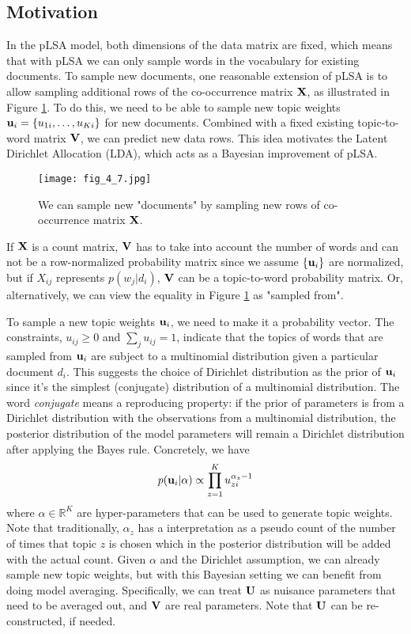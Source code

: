 \documentclass[../book-template.tex]{subfiles}
\begin{document}
\subsection{Motivation}
In the pLSA model, both dimensions of the data matrix are fixed, which means that with pLSA we can only sample words in the vocabulary for existing documents. To sample new documents, one reasonable extension of pLSA is to allow sampling additional rows of the co-occurrence matrix ${\bf X}$, as illustrated in Figure \ref{fig_4_7}. To do this, we need to be able to sample new topic weights ${\bf u}_i=\{u_{1i},\dots,u_{Ki}\}$ for new documents. Combined with a fixed existing topic-to-word matrix ${\bf V}$, we can predict new data rows. This idea motivates the Latent Dirichlet Allocation (LDA), which acts as a Bayesian improvement of pLSA. 
\begin{figure}[h] 
	\centering 
	\texttt{[image: fig\_4\_7.jpg]} 
	\caption{We can sample new "documents" by sampling new rows of co-occurrence matrix ${\bf X}$.}\label{fig_4_7}
\end{figure}
\begin{remark}
	If ${\bf X}$ is a count matrix, ${\bf V}$ has to take into account the number of words and can not be a row-normalized probability matrix since we assume $\{{\bf u}_i\}$ are normalized, but if $X_{ij}$ represents $p(w_j|d_i)$, ${\bf V}$ can be a topic-to-word probability matrix. Or, alternatively, we can view the equality in Figure \ref{fig_4_7} as "sampled from".
\end{remark}
\par To sample a new topic weights ${\bf u}_i$, we need to make it a probability vector. The constraints, $u_{ij}\geq 0$ and $\sum_j u_{ij}=1$, indicate that the topics of words that are sampled from ${\bf u}_i$ are subject to a multinomial distribution given a particular document $d_i$. This suggests the choice of Dirichlet distribution as the prior of ${\bf u}_i$ since it's the simplest (conjugate) distribution of a multinomial distribution. The word \emph{conjugate} means a reproducing property: if the prior of parameters is from a Dirichlet distribution with the observations from a multinomial distribution, the posterior distribution of the model parameters will remain a Dirichlet distribution after applying the Bayes rule. Concretely, we have
\begin{equation*}
	p({\bf u}_i|\alpha)\propto\prod_{z=1}^{K}u_{zi}^{\alpha_z-1}
\end{equation*}
where $\alpha\in \mathbb{R}^K$ are hyper-parameters that can be used to generate topic weights. Note that traditionally, $\alpha_z$ has a interpretation as a pseudo count of the number of times that topic $z$ is chosen which in the posterior distribution will be added with the actual count. Given $\alpha$ and the Dirichlet assumption, we can already sample new topic weights, but with this Bayesian setting we can benefit from doing model averaging. Specifically, we can treat ${\bf U}$ as nuisance parameters that need to be averaged out, and ${\bf V}$ are real parameters. Note that ${\bf U}$ can be re-constructed, if needed.
\end{document}
